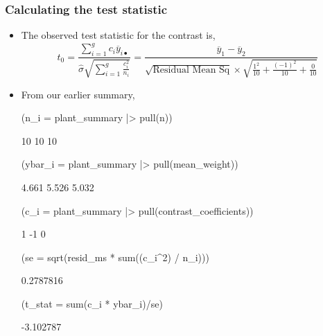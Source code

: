 \documentclass[a4paper]{article}
\begin{document}
\subsubsection{Calculating the test statistic}
\begin{itemize}
	\item The observed test statistic for the contrast is,
	\[
		t_0 = \frac{\sum_{i=1}^gc_i\overline y_{i\bullet}}{\hat\sigma\sqrt{\sum_{i=1}^g \frac{c_i^2}{n_i}}} = \frac{\overline{y}_1 - \overline{y}_2 }{\sqrt{\text{Residual Mean Sq}}\times \sqrt{\frac{1^2}{10} + \frac{(-1)^2}{10} + \frac{0}{10}}}
	\]
	\item From our earlier summary,
\begin{Schunk}
\begin{Sinput}
(n_i = plant_summary |> pull(n))
\end{Sinput}
\begin{Soutput}
[1] 10 10 10
\end{Soutput}
\begin{Sinput}
(ybar_i = plant_summary |> pull(mean_weight))
\end{Sinput}
\begin{Soutput}
[1] 4.661 5.526 5.032
\end{Soutput}
\begin{Sinput}
(c_i =  plant_summary |> pull(contrast_coefficients))
\end{Sinput}
\begin{Soutput}
[1]  1 -1  0
\end{Soutput}
\begin{Sinput}
(se = sqrt(resid_ms * sum((c_i^2) / n_i)))
\end{Sinput}
\begin{Soutput}
[1] 0.2787816
\end{Soutput}
\begin{Sinput}
(t_stat = sum(c_i * ybar_i)/se)
\end{Sinput}
\begin{Soutput}
[1] -3.102787
\end{Soutput}
\end{Schunk}
\end{itemize}
\end{document}
